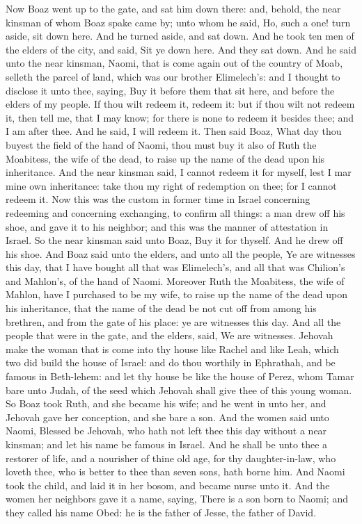 Now Boaz went up to the gate, and sat him down there: and, behold, the near kinsman of whom Boaz spake came by; unto whom he said, Ho, such a one! turn aside, sit down here. And he turned aside, and sat down. And he took ten men of the elders of the city, and said, Sit ye down here. And they sat down. And he said unto the near kinsman, Naomi, that is come again out of the country of Moab, selleth the parcel of land, which was our brother Elimelech’s: and I thought to disclose it unto thee, saying, Buy it before them that sit here, and before the elders of my people. If thou wilt redeem it, redeem it: but if thou wilt not redeem it, then tell me, that I may know; for there is none to redeem it besides thee; and I am after thee. And he said, I will redeem it. Then said Boaz, What day thou buyest the field of the hand of Naomi, thou must buy it also of Ruth the Moabitess, the wife of the dead, to raise up the name of the dead upon his inheritance. And the near kinsman said, I cannot redeem it for myself, lest I mar mine own inheritance: take thou my right of redemption on thee; for I cannot redeem it.  Now this was the custom in former time in Israel concerning redeeming and concerning exchanging, to confirm all things: a man drew off his shoe, and gave it to his neighbor; and this was the manner of attestation in Israel. So the near kinsman said unto Boaz, Buy it for thyself. And he drew off his shoe. And Boaz said unto the elders, and unto all the people, Ye are witnesses this day, that I have bought all that was Elimelech’s, and all that was Chilion’s and Mahlon’s, of the hand of Naomi. Moreover Ruth the Moabitess, the wife of Mahlon, have I purchased to be my wife, to raise up the name of the dead upon his inheritance, that the name of the dead be not cut off from among his brethren, and from the gate of his place: ye are witnesses this day. And all the people that were in the gate, and the elders, said, We are witnesses. Jehovah make the woman that is come into thy house like Rachel and like Leah, which two did build the house of Israel: and do thou worthily in Ephrathah, and be famous in Beth-lehem: and let thy house be like the house of Perez, whom Tamar bare unto Judah, of the seed which Jehovah shall give thee of this young woman.  So Boaz took Ruth, and she became his wife; and he went in unto her, and Jehovah gave her conception, and she bare a son. And the women said unto Naomi, Blessed be Jehovah, who hath not left thee this day without a near kinsman; and let his name be famous in Israel. And he shall be unto thee a restorer of life, and a nourisher of thine old age, for thy daughter-in-law, who loveth thee, who is better to thee than seven sons, hath borne him. And Naomi took the child, and laid it in her bosom, and became nurse unto it. And the women her neighbors gave it a name, saying, There is a son born to Naomi; and they called his name Obed: he is the father of Jesse, the father of David.  

